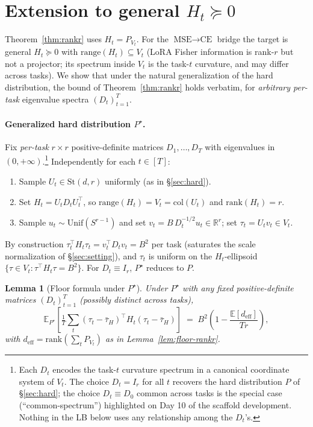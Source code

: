 \documentclass{article}
\newtheorem{lemma}[theorem]{Lemma}
\theoremstyle{remark}
\newcommand{\R}{\mathbb{R}}
\newcommand{\E}{\mathbb{E}}
\newcommand{\rank}{\mathrm{rank}}
\newcommand{\range}{\mathrm{range}}
\newcommand{\deff}{d_{\mathrm{eff}}}
\newcommand{\tauH}{\bar\tau_{H}}
\newcommand{\Stiefel}{\mathrm{St}}
\begin{document}
\section{Extension to general $H_t \succeq 0$}\label{sec:general-ht}

Theorem~\ref{thm:rankr} uses $H_t = P_{V_t}$. For the
$\text{MSE}\to\text{CE}$ bridge the target is general $H_t \succeq 0$
with $\range(H_t)\subseteq V_t$ (LoRA Fisher information is rank-$r$
but not a projector; its spectrum inside $V_t$ is the task-$t$
curvature, and may differ across tasks). We show that under the
natural generalization of the hard distribution, the bound of
Theorem~\ref{thm:rankr} holds verbatim, for \emph{arbitrary
per-task} eigenvalue spectra $(D_t)_{t=1}^T$.

\paragraph{Generalized hard distribution $P^\star$.} Fix
\emph{per-task} $r\times r$ positive-definite matrices $D_1, \dots,
D_T$ with eigenvalues in $(0, +\infty)$.\footnote{%
  Each $D_t$ encodes the task-$t$ curvature spectrum in a canonical
  coordinate system of $V_t$. The choice $D_t = I_r$ for all $t$
  recovers the hard distribution $P$ of \S\ref{sec:hard}; the choice
  $D_t \equiv D_0$ common across tasks is the special case
  (``common-spectrum'') highlighted on Day 10 of the scaffold
  development. Nothing in the LB below uses any relationship among
  the $D_t$'s.} Independently for each $t\in[T]$:
\begin{enumerate}
  \item Sample $U_t \in \Stiefel(d, r)$ uniformly (as in \S\ref{sec:hard}).
  \item Set $H_t = U_t D_t U_t^\top$, so $\range(H_t) = V_t =
        \mathrm{col}(U_t)$ and $\rank(H_t) = r$.
  \item Sample $u_t \sim \mathrm{Unif}(S^{r-1})$ and set $v_t =
        B\,D_t^{-1/2} u_t \in \R^r$; set $\tau_t = U_t v_t\in V_t$.
\end{enumerate}
By construction $\tau_t^\top H_t \tau_t = v_t^\top D_t v_t = B^2$
per task (saturates the scale normalization of
\S\ref{sec:setting}), and $\tau_t$ is uniform on the $H_t$-ellipsoid
$\{\tau\in V_t : \tau^\top H_t\tau = B^2\}$. For $D_t \equiv I_r$,
$P^\star$ reduces to $P$.

\begin{lemma}[Floor formula under $P^\star$]\label{lem:floor-general}
Under $P^\star$ with any fixed positive-definite matrices
$(D_t)_{t=1}^T$ (possibly distinct across tasks),
\[
  \E_{P^\star}\!\left[\tfrac1T\sum_t(\tau_t-\tauH)^\top H_t(\tau_t-\tauH)\right]
  \;=\; B^2\!\left(1 - \frac{\E[\deff]}{Tr}\right),
\]
with $\deff = \rank(\sum_t P_{V_t})$ as in Lemma~\ref{lem:floor-rankr}.
\end{lemma}
\end{document}
